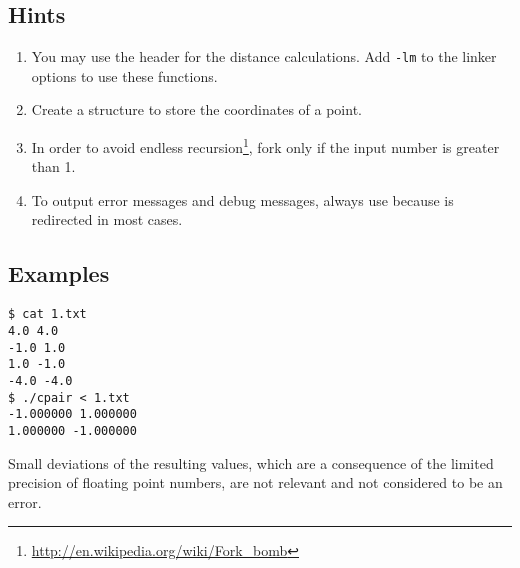 \clearpage
\subsection*{Hints}
\begin{enumerate}
\item You may use the header  for the distance calculations.
Add \verb|-lm| to the linker options to use these functions.
\item Create a structure to store the coordinates of a point.
\item In order to avoid endless recursion\footnote{\url{http://en.wikipedia.org/wiki/Fork\_bomb}},
fork only if the input number is greater than 1.
\item To output error messages and debug messages, always use
 because  is redirected in most cases.
\end{enumerate}

\subsection*{Examples}
\begin{verbatim}
$ cat 1.txt
4.0 4.0
-1.0 1.0
1.0 -1.0
-4.0 -4.0
$ ./cpair < 1.txt
-1.000000 1.000000
1.000000 -1.000000
\end{verbatim}

Small deviations of the resulting values,
which are a consequence of the limited precision of floating point numbers,
are not relevant and not considered to be an error.



\osueguidelinestwo


